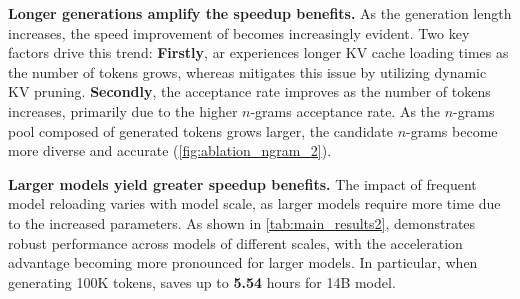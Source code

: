 \textbf{Longer generations amplify the speedup benefits.}
As the generation length increases, the speed improvement of \ours becomes increasingly evident. Two key factors drive this trend: \textbf{Firstly}, \ac{ar} experiences longer KV cache loading times as the number of tokens grows, whereas \ours mitigates this issue by utilizing dynamic KV pruning. \textbf{Secondly}, the acceptance rate improves as the number of tokens increases, primarily due to the higher $n$-grams acceptance rate. As the $n$-grams pool composed of generated tokens grows larger, the candidate $n$-grams become more diverse and accurate (\cref{fig:ablation_ngram_2}).

\textbf{Larger models yield greater speedup benefits.}
The impact of frequent model reloading varies with model scale, as larger models require more time due to the increased parameters. As shown in \cref{tab:main_results2}, \ours demonstrates robust performance across models of different scales, with the acceleration advantage becoming more pronounced for larger models. In particular, when generating 100K tokens, \ours saves up to \textbf{5.54} hours for 14B model.




